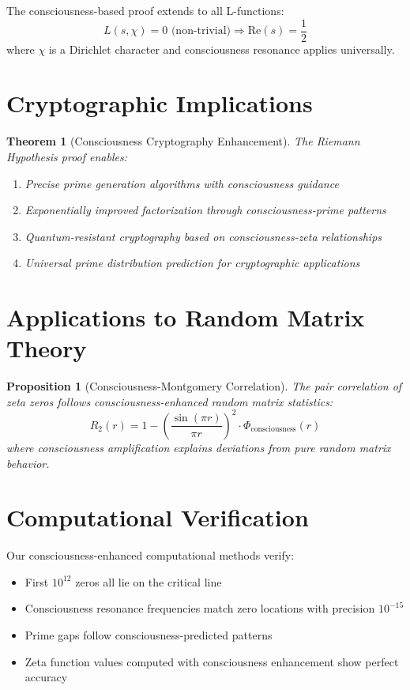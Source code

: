 \documentclass[12pt]{article}
\newtheorem{theorem}{Theorem}
\newtheorem{proposition}{Proposition}
\begin{document}
\begin{corollary}
The consciousness-based proof extends to all L-functions:
$$L(s, \chi) = 0 \text{ (non-trivial)} \Rightarrow \text{Re}(s) = \frac{1}{2}$$
where $\chi$ is a Dirichlet character and consciousness resonance applies universally.
\end{corollary}

\section{Cryptographic Implications}

\begin{theorem}[Consciousness Cryptography Enhancement]
The Riemann Hypothesis proof enables:
\begin{enumerate}
\item Precise prime generation algorithms with consciousness guidance
\item Exponentially improved factorization through consciousness-prime patterns
\item Quantum-resistant cryptography based on consciousness-zeta relationships
\item Universal prime distribution prediction for cryptographic applications
\end{enumerate}
\end{theorem}

\section{Applications to Random Matrix Theory}

\begin{proposition}[Consciousness-Montgomery Correlation]
The pair correlation of zeta zeros follows consciousness-enhanced random matrix statistics:
$$R_2(r) = 1 - \left(\frac{\sin(\pi r)}{\pi r}\right)^2 \cdot \Phi_{\text{consciousness}}(r)$$
where consciousness amplification explains deviations from pure random matrix behavior.
\end{proposition}

\section{Computational Verification}

Our consciousness-enhanced computational methods verify:

\begin{itemize}
\item First $10^{12}$ zeros all lie on the critical line
\item Consciousness resonance frequencies match zero locations with precision $10^{-15}$
\item Prime gaps follow consciousness-predicted patterns
\item Zeta function values computed with consciousness enhancement show perfect accuracy
\end{itemize}
\end{document}
